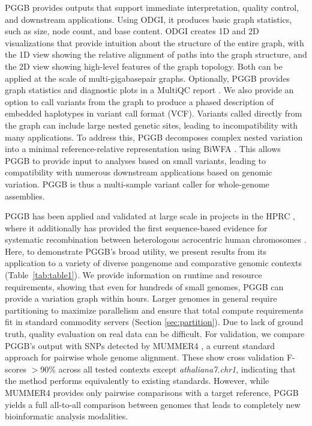 \documentclass[pdflatex,mathphys]{jnl}%
\theoremstyle{thmstyleone}%
\theoremstyle{thmstyletwo}%
\theoremstyle{thmstylethree}%
\begin{document}
PGGB provides outputs that support immediate interpretation, quality control, and downstream applications.
Using ODGI, it produces basic graph statistics, such as size, node count, and base content.
ODGI creates 1D and 2D visualizations that provide intuition about the structure of the entire graph, with the 1D view showing the relative alignment of paths into the graph structure, and the 2D view showing high-level features of the graph topology.
Both can be applied at the scale of multi-gigabasepair graphs.
Optionally, PGGB provides graph statistics and diagnostic plots in a MultiQC report \cite{Ewels2016}.
We also provide an option to call variants \cite{Garrison_2018,Paten_2018} from the graph to produce a phased description of embedded haplotypes in variant call format (VCF).
Variants called directly from the graph can include large nested genetic sites, leading to incompatibility with many applications.
To address this, PGGB decomposes complex nested variation into a minimal reference-relative representation using BiWFA \cite{Garrison_vcflib_2022}.
This allows PGGB to provide input to analyses based on small variants, leading to compatibility with numerous downstream applications based on genomic variation.
PGGB is thus a multi-sample variant caller for whole-genome assemblies.

PGGB has been applied and validated at large scale in projects in the HPRC \cite{Liao_2023}, where it additionally has provided the first sequence-based evidence for systematic recombination between heterologous acrocentric human chromosomes \cite{Guarracino_2023}.
Here, to demonstrate PGGB's broad utility, we present results from its application to a variety of diverse pangenome and comparative genomic contexts (Table~\ref{tab:table1}).
We provide information on runtime and resource requirements, showing that even for hundreds of small genomes, PGGB can provide a variation graph within hours.
Larger genomes in general require partitioning to maximize parallelism and ensure that total compute requirements fit in standard commodity servers (Section \ref{sec:partition}).
Due to lack of ground truth, quality evaluation on real data can be difficult.
For validation, we compare PGGB's output with SNPs detected by MUMMER4 \cite{Marcais_2018}, a current standard approach for pairwise whole genome alignment.
These show cross validation F-scores $>$90\% across all tested contexts except \textit{athaliana7.chr1}, indicating that the method performs equivalently to existing standards.
However, while MUMMER4 provides only pairwise comparisons with a target reference, PGGB yields a full all-to-all comparison between genomes that leads to completely new bioinformatic analysis modalities.
\end{document}
